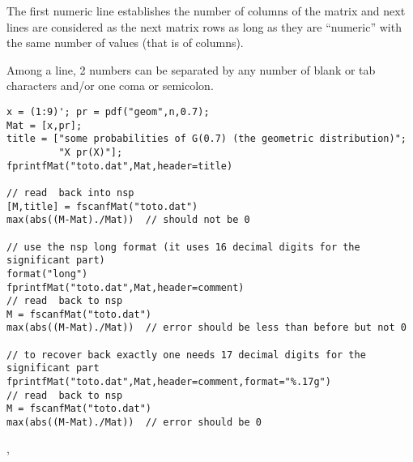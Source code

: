 The first numeric line establishes the number of columns of the matrix and next lines
are considered as the next matrix rows as long as they are ``numeric'' with the same
number of values (that is of columns).

Among a line, 2 numbers can be separated by
any number of blank or tab characters and/or one coma or semicolon.


\begin{examples}
\begin{Verbatim}
x = (1:9)'; pr = pdf("geom",n,0.7);
Mat = [x,pr];
title = ["some probabilities of G(0.7) (the geometric distribution)";
         "X pr(X)"];
fprintfMat("toto.dat",Mat,header=title)

// read  back into nsp
[M,title] = fscanfMat("toto.dat")
max(abs((M-Mat)./Mat))  // should not be 0

// use the nsp long format (it uses 16 decimal digits for the significant part)
format("long")
fprintfMat("toto.dat",Mat,header=comment)
// read  back to nsp
M = fscanfMat("toto.dat")
max(abs((M-Mat)./Mat))  // error should be less than before but not 0

// to recover back exactly one needs 17 decimal digits for the significant part
fprintfMat("toto.dat",Mat,header=comment,format="%.17g")
// read  back to nsp
M = fscanfMat("toto.dat")
max(abs((M-Mat)./Mat))  // error should be 0
\end{Verbatim}
\end{examples}

\begin{manseealso}
  , 
\end{manseealso}

